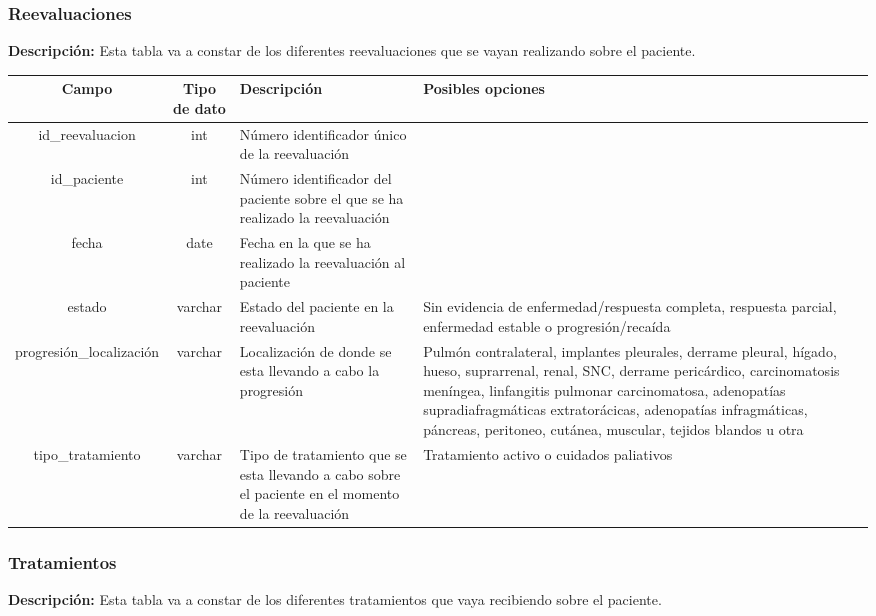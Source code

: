 \subsubsection{Reevaluaciones}

\textbf{Descripción:} Esta tabla va a constar de los diferentes reevaluaciones que se vayan realizando sobre el paciente.

\begin{longtable}{|c |c |p{3.4cm} |p{3cm} |}
\hline
Campo & Tipo de dato & Descripción & Posibles opciones\\ \hline
id\_reevaluacion & int & Número identificador único de la reevaluación & \\\hline
id\_paciente & int & Número identificador del paciente sobre el que se ha realizado la reevaluación &\\\hline
fecha & date & Fecha en la que se ha realizado la reevaluación al paciente&\\\hline
estado & varchar & Estado del paciente en la reevaluación & Sin evidencia de enfermedad/respuesta completa, respuesta parcial, enfermedad estable o progresión/recaída \\\hline
progresión\_localización & varchar & Localización de donde se esta llevando a cabo la progresión & Pulmón contralateral, implantes pleurales, derrame pleural, hígado, hueso, suprarrenal, renal, SNC, derrame pericárdico, carcinomatosis meníngea, linfangitis pulmonar carcinomatosa, adenopatías supradiafragmáticas extratorácicas, adenopatías infragmáticas, páncreas, peritoneo, cutánea, muscular, tejidos blandos u otra \\\hline
tipo\_tratamiento & varchar &Tipo de tratamiento que se esta llevando a cabo sobre el paciente en el momento de la reevaluación & Tratamiento activo o cuidados paliativos\\ \hline
\end{longtable}

\subsubsection{Tratamientos}

\textbf{Descripción:} Esta tabla va a constar de los diferentes tratamientos que vaya recibiendo sobre el paciente. 

